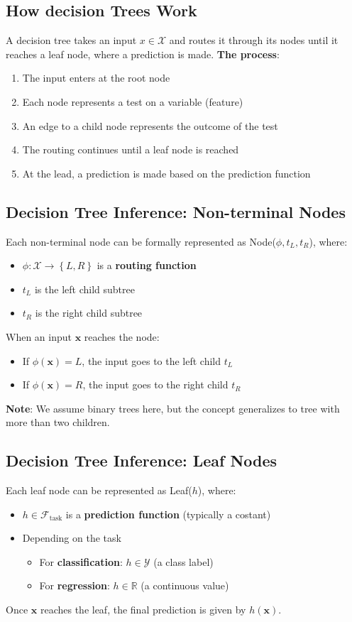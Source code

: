 \documentclass[a4paper]{article}
\theoremstyle{definition}
\begin{document}
\subsection{How decision Trees Work}
A decision tree takes an input \( x \in \mathcal{X} \) and routes it through its nodes until it reaches a leaf node, where a prediction is made.
\vspace{1em}
\noindent
\newline
\textbf{The process}:
\begin{enumerate}
    \item The input enters at the root node 
    \item Each node represents a test on a variable (feature)
    \item An edge to a child node represents the outcome of the test 
    \item The routing continues until a leaf node is reached 
    \item At the lead, a prediction is made based on the prediction function
\end{enumerate}
\subsection{Decision Tree Inference: Non-terminal Nodes}
Each non-terminal node can be formally represented as Node(\(\phi, t_L, t_R \)), where:
\begin{itemize}
    \item \( \phi: \mathcal{X} \to \left\{ L,R \right\} \) is a \textbf{routing function}
    \item \( t_L \) is the left child subtree 
    \item \( t_R \) is the right child subtree
\end{itemize}
When an input \( \mathbf{x} \) reaches the node:
\begin{itemize}
    \item If \( \phi(\mathbf{x}) = L \), the input goes to the left child \( t_L \)    
    \item If \( \phi(\mathbf{x}) = R \), the input goes to the right child \( t_R \)
\end{itemize}
\textbf{Note}: We assume binary trees here, but the concept generalizes to tree with more than two children.
\subsection{Decision Tree Inference: Leaf Nodes}
Each leaf node can be represented as Leaf(\( h \)), where:
\begin{itemize}
    \item \( h \in \mathcal{F}_{\text{task}} \) is a \textbf{prediction function} (typically a costant)
    \item Depending on the task 
    \begin{itemize}
        \item For \textbf{classification}: \( h \in \mathcal{Y} \) (a class label)
        \item For \textbf{regression}: \( h \in \mathbb{R} \) (a continuous value)
    \end{itemize}
\end{itemize}
Once \( \mathbf{x} \) reaches the leaf, the final prediction is given by \( h(\mathbf{x}) \).
\end{document}
